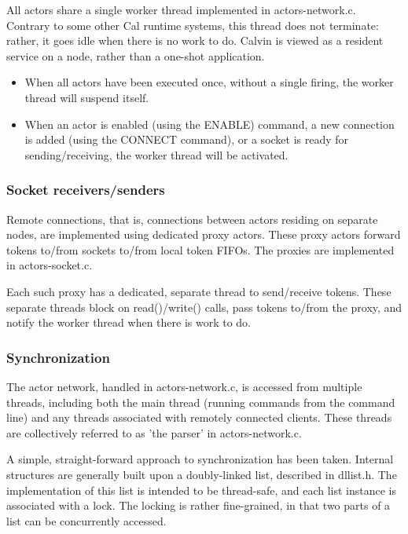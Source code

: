\documentclass[10pt, a4paper]{article}
\begin{document}
All actors share a single worker thread implemented in actors-network.c. Contrary to some other Cal runtime systems, this thread does not terminate: rather, it goes idle when there is no work to do. Calvin is viewed as a resident service on a node, rather than a one-shot application.

\begin{itemize}
\item When all actors have been executed once, without a single
  firing, the worker thread will suspend itself.
\item When an actor is enabled (using the ENABLE) command, a new
  connection is added (using the CONNECT command), or a socket is
  ready for sending/receiving, the worker thread will be activated.
\end{itemize}

\subsubsection*{Socket receivers/senders}

Remote connections, that is, connections between actors residing on
separate nodes, are implemented using dedicated proxy actors. These
proxy actors forward tokens to/from sockets to/from local token
FIFOs. The proxies are implemented in actors-socket.c.

Each such proxy has a dedicated, separate thread to send/receive
tokens. These separate threads block on read()/write() calls, pass
tokens to/from the proxy, and notify the worker thread when there is
work to do.

\subsubsection*{Synchronization}

The actor network, handled in actors-network.c, is accessed from
multiple threads, including both the main thread (running commands
from the command line) and any threads associated with remotely
connected clients. These threads are collectively referred to as 'the
parser' in actors-network.c.

A simple, straight-forward approach to synchronization has been
taken. Internal structures are generally built upon a doubly-linked
list, described in dllist.h. The implementation of this list is
intended to be thread-safe, and each list instance is associated with
a lock. The locking is rather fine-grained, in that two parts of a
list can be concurrently accessed.
\end{document}
